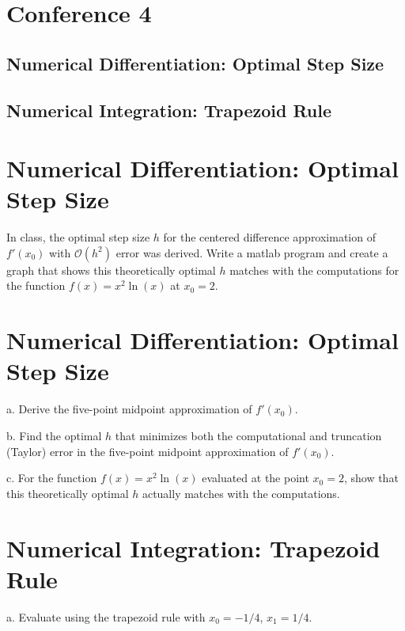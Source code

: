 \documentclass[a4paper]{article}
\begin{document}
\section*{Conference 4}
\subsection*{Numerical Differentiation: Optimal Step Size}
\subsection*{Numerical Integration: Trapezoid Rule}

\newpage

\section*{Numerical Differentiation: Optimal Step Size}

In class, the optimal step size $h$ for the centered difference approximation of $f'(x_0)$ with $\mathcal{O}(h^2)$ error was derived. Write a matlab program and create a graph that shows this theoretically optimal $h$ matches with the computations for the function $f(x) = x^2 \ln (x)$ at $x_0 = 2$. 

\newpage

\section*{Numerical Differentiation: Optimal Step Size}

a. Derive the five-point midpoint approximation of $f'(x_0)$.

\newpage

b. Find the optimal $h$ that minimizes both the computational and truncation (Taylor) error in the five-point midpoint approximation of $f'(x_0)$. 

\newpage

c. For the function $f(x)=x^2\ln(x)$ evaluated at the point $x_0=2$, show that this theoretically optimal $h$ actually matches with the computations.

\newpage

\section*{Numerical Integration: Trapezoid Rule}

a. Evaluate using the trapezoid rule with $x_0 = -1/4$, $x_1 = 1/4$.
\end{document}
